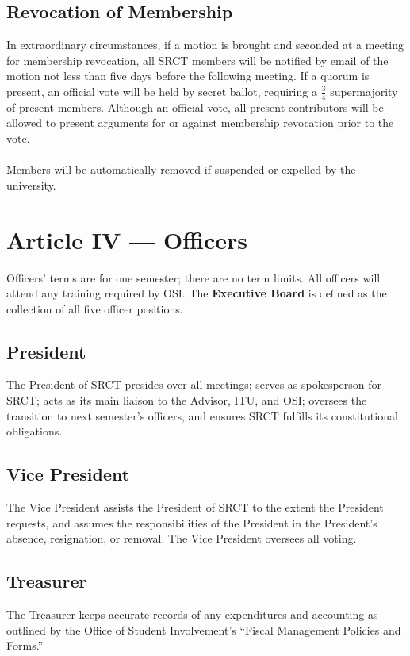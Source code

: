 \documentclass{article}
\begin{document}
  \subsection{Revocation of Membership}
  In extraordinary circumstances, if a motion is brought and seconded at 
  a meeting for membership revocation, all SRCT members will be notified 
  by email of the motion not less than five days before the following 
  meeting. If a quorum is present, an official vote will be held by 
  secret ballot, requiring a $\frac{3}{4}$ supermajority of present 
  members. Although an official vote, all present contributors will 
  be allowed to present arguments for or against membership revocation 
  prior to the vote. 
  \\ \\
  Members will be automatically removed if suspended or expelled by the 
  university.
  
  \section{Article IV --- Officers}
  Officers' terms are for one semester; there are no term limits. All 
  officers will attend any training required by OSI. The 
  \textbf{Executive Board} is defined as the collection of all five
  officer positions.
  
  \subsection{President}
  The President of SRCT presides over all meetings; serves as 
  spokesperson for SRCT; acts as its main liaison to the Advisor, ITU, 
  and OSI; oversees the transition to next semester's officers, and 
  ensures SRCT fulfills its constitutional obligations.
  
  \subsection{Vice President}
  The Vice President assists the President of SRCT to the extent the 
  President requests, and assumes the responsibilities of the President 
  in the President's absence, resignation, or removal. The Vice 
  President oversees all voting.
  
  \subsection{Treasurer}
  The Treasurer keeps accurate records of any expenditures and 
  accounting as outlined by the Office of Student Involvement's 
  ``Fiscal Management Policies and Forms.''
  
\end{document}
